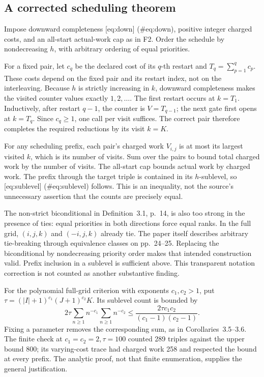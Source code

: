 \documentclass[10pt]{article}
\begin{document}
\subsection*{A corrected scheduling theorem}
Impose downward completeness [eq:down] (\#eq:down), positive integer charged costs, and an all-start actual-work cap as in F2. Order the schedule by nondecreasing \(h\), with arbitrary ordering of equal priorities.\par
For a fixed pair, let \(c_q\) be the declared cost of its \(q\)-th restart and \(T_q=\sum_{p=1}^q c_p\). These costs depend on the fixed pair and its restart index, not on the interleaving. Because \(h\) is strictly increasing in \(k\), downward completeness makes the visited counter values exactly \(1,2,\ldots\). The first restart occurs at \(k=T_1\). Inductively, after restart \(q-1\), the counter is \(V=T_{q-1}\); the next gate first opens at \(k=T_q\). Since \(c_q\ge1\), one call per visit suffices. The correct pair therefore completes the required reductions by its visit \(k=K\).\par
For any scheduling prefix, each pair’s charged work \(V_{i,j}\) is at most its largest visited \(k\), which is its number of visits. Sum over the pairs to bound total charged work by the number of visits. The all-start cap bounds actual work by charged work. The prefix through the target triple is contained in its \(h\)-sublevel, so [eq:sublevel] (\#eq:sublevel) follows. This is an inequality, not the source’s unnecessary assertion that the counts are precisely equal.\par
The non-strict biconditional in Definition 3.1, p. 14, is also too strong in the presence of ties: equal priorities in both directions force equal ranks. In the full grid, \((i,j,k)\) and \((-i,j,k)\) already tie. The paper itself describes arbitrary tie-breaking through equivalence classes on pp. 24–25. Replacing the biconditional by nondecreasing priority order makes that intended construction valid. Prefix inclusion in a sublevel is sufficient above. This transparent notation correction is not counted as another substantive finding.\par
For the polynomial full-grid criterion with exponents \(c_1,c_2>1\), put \(\tau=(|I|+1)^{c_1}(J+1)^{c_2}K\). Its sublevel count is bounded by \[2\tau\sum_{n\ge1}n^{-c_1}\sum_{n\ge1}n^{-c_2}
 \le \frac{2\tau c_1c_2}{(c_1-1)(c_2-1)}.\] Fixing a parameter removes the corresponding sum, as in Corollaries 3.5–3.6. The finite check at \(c_1=c_2=2,\tau=100\) counted 289 triples against the upper bound 800; its varying-cost trace had charged work 258 and respected the bound at every prefix. The analytic proof, not that finite enumeration, supplies the general justification.\par
\end{document}
